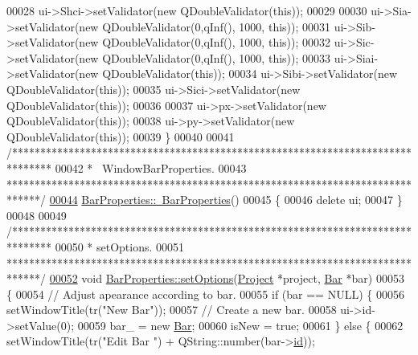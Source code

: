 \begin{DoxyCode}
00028   ui->Shci->setValidator(\textcolor{keyword}{new} QDoubleValidator(\textcolor{keyword}{this}));
00029 
00030   ui->Sia->setValidator(\textcolor{keyword}{new} QDoubleValidator(0,qInf(), 1000, \textcolor{keyword}{this}));
00031   ui->Sib->setValidator(\textcolor{keyword}{new} QDoubleValidator(0,qInf(), 1000, \textcolor{keyword}{this}));
00032   ui->Sic->setValidator(\textcolor{keyword}{new} QDoubleValidator(0,qInf(), 1000, \textcolor{keyword}{this}));
00033   ui->Siai->setValidator(\textcolor{keyword}{new} QDoubleValidator(\textcolor{keyword}{this}));
00034   ui->Sibi->setValidator(\textcolor{keyword}{new} QDoubleValidator(\textcolor{keyword}{this}));
00035   ui->Sici->setValidator(\textcolor{keyword}{new} QDoubleValidator(\textcolor{keyword}{this}));
00036 
00037   ui->px->setValidator(\textcolor{keyword}{new} QDoubleValidator(\textcolor{keyword}{this}));
00038   ui->py->setValidator(\textcolor{keyword}{new} QDoubleValidator(\textcolor{keyword}{this}));
00039 \}
00040 
00041 \textcolor{comment}{/*******************************************************************************}
00042 \textcolor{comment}{ * ~WindowBarProperties.}
00043 \textcolor{comment}{ ******************************************************************************/}
\hypertarget{barproperties_8cpp_source_l00044}{}\hyperlink{class_bar_properties_a639b4da849970025a2935ee965d6a465}{00044} \hyperlink{class_bar_properties_a639b4da849970025a2935ee965d6a465}{BarProperties::~BarProperties}()
00045 \{
00046   \textcolor{keyword}{delete} ui;
00047 \}
00048 
00049 \textcolor{comment}{/*******************************************************************************}
00050 \textcolor{comment}{ * setOptions.}
00051 \textcolor{comment}{ ******************************************************************************/}
\hypertarget{barproperties_8cpp_source_l00052}{}\hyperlink{class_bar_properties_a80cba99404820272603c4da8fb708c05}{00052} \textcolor{keywordtype}{void} \hyperlink{class_bar_properties_a80cba99404820272603c4da8fb708c05}{BarProperties::setOptions}(\hyperlink{class_project}{Project} *project, 
      \hyperlink{class_bar}{Bar} *bar)
00053 \{
00054   \textcolor{comment}{// Adjust apearance according to bar.}
00055   \textcolor{keywordflow}{if} (bar == NULL) \{
00056     setWindowTitle(tr(\textcolor{stringliteral}{"New Bar"}));
00057     \textcolor{comment}{// Create a new bar.}
00058     ui->id->setValue(0);
00059     bar\_ = \textcolor{keyword}{new} \hyperlink{class_bar}{Bar};
00060     isNew = \textcolor{keyword}{true};
00061   \} \textcolor{keywordflow}{else} \{
00062     setWindowTitle(tr(\textcolor{stringliteral}{"Edit Bar "}) + QString::number(bar->\hyperlink{class_bar_a9dc5c6a6d44fe412ae34ef8a881b8dce}{id}));

\end{DoxyCode}
